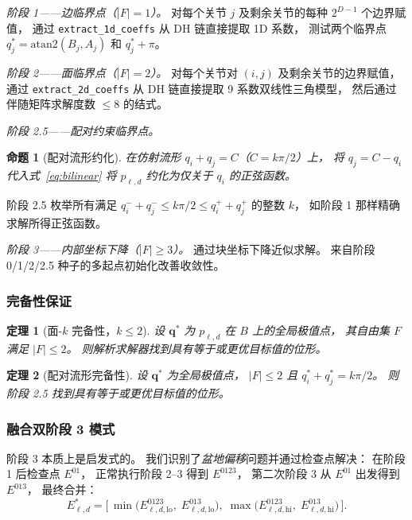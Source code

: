 \documentclass[journal]{IEEEtran}
\newtheorem{theorem}{定理}
\newtheorem{proposition}{命题}
\begin{document}
\emph{阶段 1——边临界点（$|F|=1$）。}
对每个关节 $j$ 及剩余关节的每种 $2^{D-1}$ 个边界赋值，
通过 \texttt{extract\_1d\_coeffs} 从 DH 链直接提取 1D 系数，
测试两个临界点
$q_j^* = \mathrm{atan2}(B_j,A_j)$ 和 $q_j^*+\pi$。

\emph{阶段 2——面临界点（$|F|=2$）。}
对每个关节对 $(i,j)$ 及剩余关节的边界赋值，
通过 \texttt{extract\_2d\_coeffs} 从 DH 链直接提取
9 系数双线性三角模型，
然后通过伴随矩阵求解度数 $\leq 8$ 的结式。

\emph{阶段 2.5——配对约束临界点。}
\begin{proposition}[配对流形约化]\label{prop:pair_reduce}
在仿射流形 $q_i + q_j = C$（$C = k\pi/2$）上，
将 $q_j = C - q_i$ 代入式~\eqref{eq:bilinear}
将 $p_{\ell,d}$ 约化为仅关于 $q_i$ 的正弦函数。
\end{proposition}
阶段 2.5 枚举所有满足
$q_i^- + q_j^- \leq k\pi/2 \leq q_i^+ + q_j^+$ 的整数 $k$，
如阶段 1 那样精确求解所得正弦函数。

\emph{阶段 3——内部坐标下降（$|F|\geq 3$）。}
通过块坐标下降近似求解。
来自阶段 0/1/2/2.5 种子的多起点初始化改善收敛性。


\subsubsection{完备性保证}\label{sec:completeness}

\begin{theorem}[面-$k$ 完备性，$k \leq 2$]\label{thm:face_complete}
设 $\bm{q}^*$ 为 $p_{\ell,d}$ 在 $B$ 上的全局极值点，
其自由集 $F$ 满足 $|F|\leq 2$。
则解析求解器找到具有等于或更优目标值的位形。
\end{theorem}

\begin{theorem}[配对流形完备性]\label{thm:pair_complete}
设 $\bm{q}^*$ 为全局极值点，
$|F| \leq 2$ 且 $q_i^* + q_j^* = k\pi/2$。
则阶段 2.5 找到具有等于或更优目标值的位形。
\end{theorem}


\subsubsection{融合双阶段 3 模式}\label{sec:dual_phase3}

阶段 3 本质上是启发式的。
我们识别了\emph{盆地偏移}问题并通过检查点解决：
在阶段 1 后检查点 $E^{01}$，
正常执行阶段 2--3 得到 $E^{0123}$，
第二次阶段 3 从 $E^{01}$ 出发得到 $E^{013}$，
最终合并：
\begin{equation}\label{eq:dual_merge}
  E^*_{\ell,d} = \bigl[\,
    \min\!\bigl(E^{0123}_{\ell,d,\mathrm{lo}},\;
                E^{013}_{\ell,d,\mathrm{lo}}\bigr),\;
    \max\!\bigl(E^{0123}_{\ell,d,\mathrm{hi}},\;
                E^{013}_{\ell,d,\mathrm{hi}}\bigr)
  \,\bigr].
\end{equation}
\end{document}
